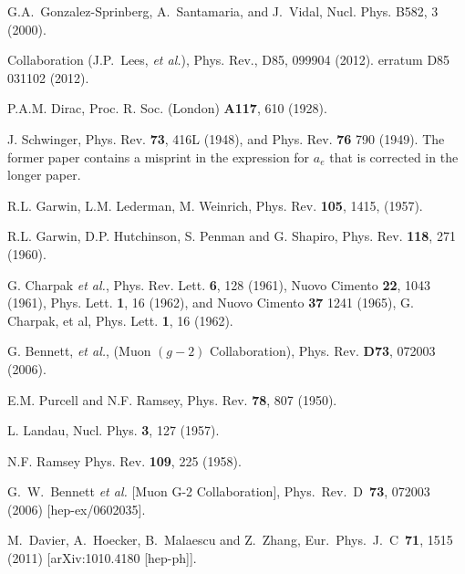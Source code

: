 \begin{thebibliography}{99}
  
G.A.~Gonzalez-Sprinberg, A.~Santamaria, and
                        J.~Vidal, 
Nucl. Phys. B582, 3 (2000).

\babar Collaboration (J.P.~Lees, {\it et al.}),
Phys. Rev., D85, 099904 (2012). erratum {\ibid} D85 031102 (2012).
      

 P.A.M. Dirac, Proc. R. Soc. (London) {\bf A117}, 610 (1928).


  J. Schwinger, Phys. Rev. {\bf 73}, 416L (1948), and
Phys. Rev. {\bf 76} 790 (1949). The former paper contains a misprint
in the expression for $a_e$ that is corrected in the longer paper.

 R.L. Garwin, L.M. Lederman, M. Weinrich,
Phys. Rev. {\bf 105}, 1415, (1957).

 R.L. Garwin, D.P. Hutchinson, S. Penman and G. Shapiro,
Phys. Rev. {\bf 118}, 271 (1960).

 G. Charpak {\it et al.},
 Phys. Rev. Lett. {\bf 6}, 128 (1961),
 Nuovo Cimento {\bf  22}, 1043 (1961),
 Phys. Lett. {\bf 1}, 16 (1962), and Nuovo Cimento {\bf 37} 1241 (1965),
 G. Charpak, et al,  Phys. Lett. {\bf 1}, 16 (1962).

 G. Bennett, {\it et al.},  (Muon $(g-2)$ Collaboration),
Phys. Rev. {\bf D73}, 072003 (2006).

E.M. Purcell and N.F. Ramsey,
 Phys. Rev. {\bf 78}, 807 (1950).

  L. Landau, Nucl. Phys. {\bf 3}, 127 (1957).

 N.F. Ramsey Phys. Rev. {\bf 109}, 225 (1958).


  G.~W.~Bennett {\it et al.} [Muon G-2 Collaboration],
  Phys.\ Rev.\ D\ {\bf 73}, 072003  (2006)
  [hep-ex/0602035].

  M.~Davier, A.~Hoecker, B.~Malaescu and Z.~Zhang,
  Eur.\ Phys.\ J.\ C\ {\bf 71}, 1515  (2011)
  [arXiv:1010.4180 [hep-ph]].


\end{thebibliography}
